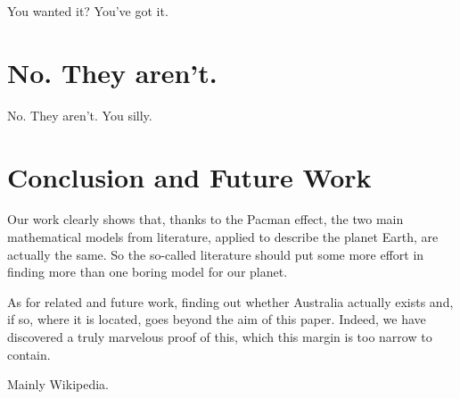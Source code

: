 \documentclass{article}
\begin{document}

You wanted it? You've got it.


\section{No. They aren't.}
No. They aren't. You silly.
\section{Conclusion and Future Work}
Our work clearly shows that, thanks to the Pacman effect, the two main mathematical models from literature, applied to describe the planet Earth, are actually the same. So the so-called literature should put some more effort in finding more than one boring model for our planet.

As for related and future work, finding out whether Australia actually exists and, if so, where it is located, goes beyond the aim of this paper. Indeed, we have discovered a truly marvelous proof of this, which this margin is too narrow to contain.

\begin{thebibliography}{1}

  Mainly Wikipedia.

\end{thebibliography}
\end{document}
